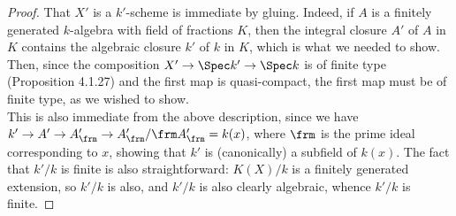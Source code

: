 \begin{proof}
	That $X'$ is a $k'$-scheme is immediate by gluing. Indeed, if $A$ is a finitely generated $k$-algebra with field of fractions $K$, then the integral closure $A'$ of $A$ in $K$ contains the algebraic closure $k'$ of $k$ in $K$, which is what we needed to show. Then, since the composition $X' \to \Spec k' \to \Spec k$ is of finite type (Proposition 4.1.27) and the first map is quasi-compact, the first map must be of finite type, as we wished to show. \\
	
	This is also immediate from the above description, since we have $k' \to A' \to A'_\frm \to A'_\frm/\frm A'_\frm = k(x)$, where $\frm$ is the prime ideal corresponding to $x$, showing that $k'$ is (canonically) a subfield of $k(x)$. The fact that $k'/k$ is finite is also straightforward: $K(X)/k$ is a finitely generated extension, so $k'/k$ is also, and $k'/k$ is also clearly algebraic, whence $k'/k$ is finite.
\end{proof}
